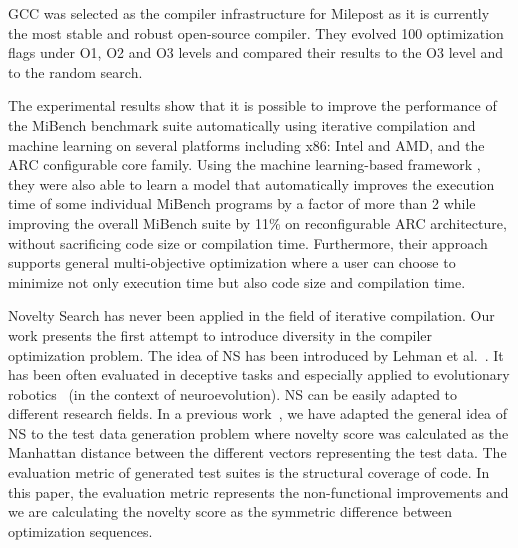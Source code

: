 GCC was selected as the compiler infrastructure for Milepost as it is currently the most stable and robust open-source compiler. They evolved 100 optimization flags under O1, O2 and O3 levels and compared their results to the O3 level and to the random search.

The experimental results show that it is possible to improve the performance of the MiBench benchmark suite automatically using iterative compilation and machine learning on several platforms including x86: Intel and AMD, and the ARC configurable core family. Using the machine learning-based framework , they were also able to learn a model that automatically improves the execution time of some individual MiBench programs by a factor of more than 2 while improving the overall MiBench suite by 11\% on reconfigurable ARC architecture, without sacrificing code size or compilation time. Furthermore, their approach supports general multi-objective optimization where a user can choose to minimize not only execution time but also code size and compilation time.




 

\iffalse
Novelty Search has never been applied in the field of iterative compilation. Our work presents the first attempt to introduce diversity in the compiler optimization problem. 
The idea of NS has been introduced by Lehman et al.~\cite{lehman2008exploiting}. It has been often evaluated in deceptive tasks and especially applied to evolutionary robotics~\cite{risi2010evolving,krvcah2012solving} (in the context of neuroevolution). 
NS can be easily adapted to different research fields. In a previous work~\cite{boussaa2015novelty}, we have adapted the general idea of NS to the test data generation problem where novelty score was calculated as the Manhattan distance between the different vectors representing the test data. The evaluation metric of generated test suites is the structural coverage of code.
In this paper, the evaluation metric represents the non-functional improvements and we are calculating the novelty score as the symmetric difference between optimization sequences. 

